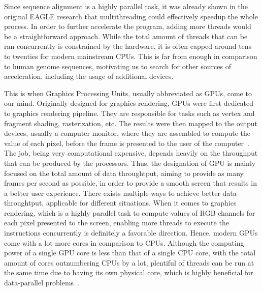 \documentclass{PHlab-thesis}
\begin{document}
Since sequence alignment is a highly parallel task, it was already shown in the original EAGLE research that multithreading could effectively speedup the whole process. In order to further accelerate the program, adding more threads would be a straightforward approach. While the total amount of threads that can be ran concurrently is constrained by the hardware, it is often capped around tens to twenties for modern mainstream CPUs. This is far from enough in comparison to human genome sequences, motivating us to search for other sources of acceleration, including the usage of additional devices. 

This is when Graphics Processing Units, usually abbreviated as GPUs, come to our mind. Originally designed for graphics rendering, GPUs were first dedicated to graphics rendering pipeline. They are responsible for tasks such as vertex and fragment shading, rasterization, etc. The results were then mapped to the output devices, usually a computer monitor, where they are assembled to compute the value of each pixel, before the frame is presented to the user of the computer~\cite{foley1994introduction,owens2008gpu}. The job, being very computational expensive, depends heavily on the throughput that can be produced by the processors. Thus, the designation of GPU is mainly focused on the total amount of data throughtput, aiming to provide as many frames per second as possible, in order to provide a smooth screen that results in a better user experience. There exists multiple ways to achieve better data throughtput, applicable for different situations. When it comes to graphics rendering, which is a highly parallel task to compute values of RGB channels for each pixel presented to the screen, enabling more threads to execute the instructions concurrently is definitely a favorable direction. Hence, modern GPUs come with a lot more cores in comparison to CPUs. Although the computing power of a single GPU core is less than that of a single CPU core, with the total amount of cores outnumbering CPUs by a lot, plentiful of threads can be run at the same time due to having its own physical core, which is highly beneficial for data-parallel problems~\cite{navarro2014survey}. 
\end{document}

